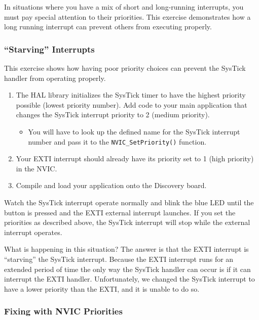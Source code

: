 \documentclass[11pt,fleqn]{book} %
\begin{document}
\begin{exercise}
   \label{ex7}  
   In situations where you have a mix of short and long-running interrupts, you must pay special attention to their priorities. This exercise demonstrates how a long running interrupt can prevent others from executing properly. 
   
    \subsubsection{``Starving'' Interrupts}
    This exercise shows how having poor priority choices can prevent the SysTick handler from operating properly.  
    
    \begin{enumerate}
        \item The HAL library initializes the SysTick timer to have the highest priority possible (lowest priority number). Add code to your main application that changes the SysTick interrupt priority to 2 (medium priority). 
        \begin{itemize}
            \item You will have to look up the defined name for the SysTick interrupt number and pass it to the \texttt{NVIC\_SetPriority()} function.
        \end{itemize} 
        \item Your EXTI interrupt should already have its priority set to 1 (high priority) in the NVIC.
        \item Compile and load your application onto the Discovery board.
    \end{enumerate}
    
    \noindent Watch the SysTick interrupt operate normally and blink the blue LED until the button is pressed and the EXTI external interrupt launches. If you set the priorities as described above, the SysTick interrupt will stop while the external interrupt operates. 
    
    What is happening in this situation? The answer is that the EXTI interrupt is ``starving'' the SysTick interrupt. Because the EXTI interrupt runs for an extended period of time the only way the SysTick handler can occur is if it can interrupt the EXTI handler. Unfortunately, we changed the SysTick interrupt to have a lower priority than the EXTI, and it is unable to do so.

    \subsubsection{Fixing with NVIC Priorities}
    

\end{exercise}
\end{document}

